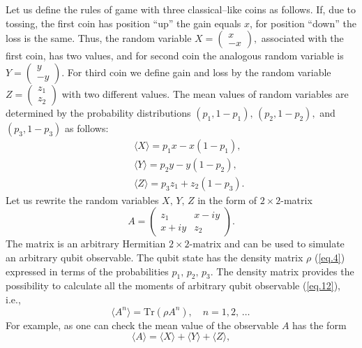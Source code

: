 \documentclass[12pt]{article}
\begin{document}
Let us define the rules of game with three classical--like coins as follows. If, due to tossing, the first coin has position ``up'' the gain equals $x$, for position ``down'' the loss is the same. Thus, the random variable 
$X=\left(\begin{array}{c}
x\\-x\end{array}\right),$ 
associated with the first coin, has two values, and for second coin the analogous random variable is 
$Y=\left(\begin{array}{c}
y\\-y\end{array}\right).$ 
For third coin we define gain and loss by the random variable 
$Z=\left(\begin{array}{c}
z_1\\z_2\end{array}\right)$ 
with two different values. The mean values of random variables are determined by the probability distributions $(p_1,1-p_1),\,(p_2,1-p_2),$ and $(p_3,1-p_3)$ as follows:  
\begin{eqnarray}%
&&\langle X\rangle=p_1 x-x(1-p_1), \nonumber\\
&&\langle Y\rangle=p_2 y-y(1-p_2),\label{eq.11}\\
&&\langle Z\rangle=p_3 z_1+z_2(1-p_3).\nonumber
\end{eqnarray}
Let us rewrite the random variables $X,\,Y,\,Z$ in the form of $2\times2$-matrix 
\begin{equation}\label{eq.12}
A=\left(\begin{array}{cc}
z_1&x-iy\\
x+i y&z_2\end{array}\right).
\end{equation}
The matrix is an arbitrary Hermitian $2\times2$-matrix and can be used to simulate an arbitrary qubit observable. The qubit state has the  density matrix $\rho$ (\ref{eq.4}) expressed in terms of the probabilities $p_1,\,p_2,\,p_3$. The density matrix provides the possibility to calculate all the moments of arbitrary qubit observable (\ref{eq.12}), i.e.,  
\begin{equation}\label{eq.13}
\langle A^n\rangle=\mbox{Tr}(\rho A^n), \quad n=1,2,\,\ldots\,
\end{equation}
For example, as one can check the mean value of the observable $A$ has the form
\begin{equation}\label{eq.14}
\langle A\rangle=\langle X\rangle+\langle Y\rangle+\langle Z\rangle, 
\end{equation}
\end{document}
